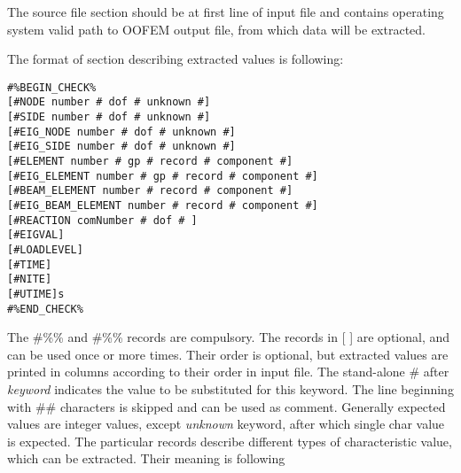 The source file section should be at first line of input file and
contains operating system valid path to OOFEM output file, from which
data will be extracted.

The format of section describing extracted values is following:
\begin{verbatim}
#%BEGIN_CHECK%
[#NODE number # dof # unknown #]
[#SIDE number # dof # unknown #]
[#EIG_NODE number # dof # unknown #]
[#EIG_SIDE number # dof # unknown #]
[#ELEMENT number # gp # record # component #]
[#EIG_ELEMENT number # gp # record # component #]
[#BEAM_ELEMENT number # record # component #]
[#EIG_BEAM_ELEMENT number # record # component #]
[#REACTION comNumber # dof # ]
[#EIGVAL]
[#LOADLEVEL]
[#TIME]
[#NITE]
[#UTIME]s
#%END_CHECK%
\end{verbatim}
The \#\%\% and \#\%\% records are compulsory.
The records in [ ] are optional, and can be used once or more
times. Their order is optional, but extracted values are printed in
columns according to their order in input file. The stand-alone \#
after {\em keyword} indicates the value to be substituted for this
keyword. The line beginning with \#\# characters is skipped and can be
used as comment. Generally expected values are integer values, except {\em
unknown} keyword, after which single char value is expected. The
particular records describe different types of characteristic value,
which can be extracted. Their meaning is following
